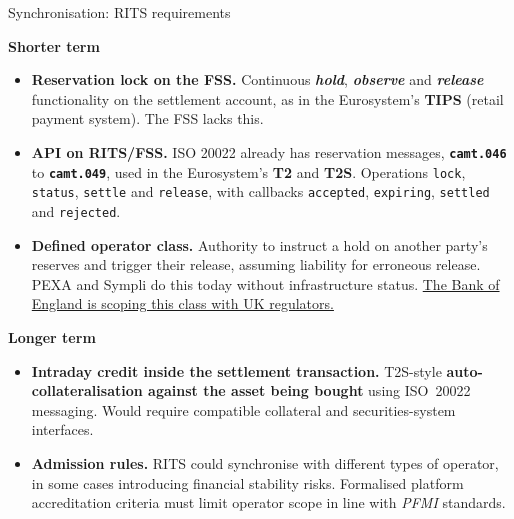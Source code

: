 \documentclass[aspectratio=169,12pt]{beamer}
\makeatletter
\newcommand{\rust}[1]{{\color{Rust}\bfseries\fontsize{\dimexpr\f@size pt+0.7pt\relax}{\f@baselineskip}\selectfont #1}}
\makeatother
\begin{document}
\begin{frame}[t]{Synchronisation: RITS requirements}
\fontsize{8.0}{10.0}\selectfont
\vspace{-0.1em}
  {\color{Ink}\bfseries\fontsize{8.2}{10}\selectfont Shorter term\par}\vspace{-0.15em}
  \vspace{0pt plus 0.35fill}\begin{itemize}\setlength{\itemsep}{2pt plus 2.4fill}
    \item \rust{Reservation lock on the FSS.} Continuous \textbf{\textit{hold}}, \textbf{\textit{observe}} and \textbf{\textit{release}} functionality on the settlement account, as in the Eurosystem's \textbf{TIPS} (retail payment system). The FSS lacks this.
    \item \rust{API on RITS/FSS.} ISO 20022 already has reservation messages, \textbf{\texttt{camt.046}} to \textbf{\texttt{camt.049}}, used in the Eurosystem's \textbf{T2} and \textbf{T2S}. Operations \texttt{lock}, \texttt{status}, \texttt{settle} and \texttt{release}, with callbacks \texttt{accepted}, \texttt{expiring}, \texttt{settled} and \texttt{rejected}.
    \item \rust{Defined operator class.} Authority to instruct a hold on another party's reserves and trigger their release, assuming liability for erroneous release. PEXA and Sympli do this today without infrastructure status. \href{https://www.bankofengland.co.uk/minutes/2026/april/synchronisation-thematic-engagement-working-group}{The Bank of England is scoping this class with UK regulators.}
  \end{itemize}
\vspace{0.30cm plus 1fill}
  {\color{Ink}\bfseries\fontsize{8.2}{10}\selectfont Longer term\par}\vspace{-0.15em}
  \vspace{0pt plus 0.35fill}\begin{itemize}\setlength{\itemsep}{2pt plus 2.4fill}
    \item \rust{Intraday credit inside the settlement transaction.} T2S-style \textbf{auto-collateralisation against the asset being bought} using ISO~20022 messaging. Would require compatible collateral and securities-system interfaces.
    \item \rust{Admission rules.} RITS could synchronise with different types of operator, in some cases introducing financial stability risks. Formalised platform accreditation criteria must limit operator scope in line with \emph{PFMI} standards.

\end{itemize}
\end{frame}
\end{document}
